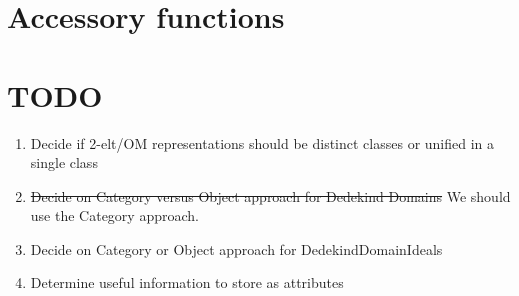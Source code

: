 \documentclass{amsart}
\theoremstyle{definition}
\begin{document}
\section{Accessory functions}

\section{TODO}

\begin{enumerate}
	\item
		Decide if 2-elt/OM representations should be distinct classes or unified in a single class
	\item
		\st{ Decide on Category versus Object approach for Dedekind Domains} We should use the Category approach.
	\item
		Decide on Category or Object approach for DedekindDomainIdeals
	\item
		Determine useful information to store as attributes
\end{enumerate}
\end{document}
